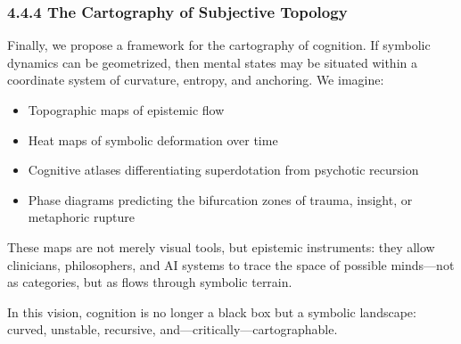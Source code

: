 \subsubsection*{4.4.4 The Cartography of Subjective Topology}

Finally, we propose a framework for the cartography of cognition. If symbolic dynamics can be geometrized, then mental states may be situated within a coordinate system of curvature, entropy, and anchoring. We imagine:
\begin{itemize}
\item Topographic maps of epistemic flow
\item Heat maps of symbolic deformation over time
\item Cognitive atlases differentiating superdotation from psychotic recursion
\item Phase diagrams predicting the bifurcation zones of trauma, insight, or metaphoric rupture
\end{itemize}

These maps are not merely visual tools, but epistemic instruments: they allow clinicians, philosophers, and AI systems to trace the space of possible minds—not as categories, but as flows through symbolic terrain.

In this vision, cognition is no longer a black box but a symbolic landscape: curved, unstable, recursive, and—critically—cartographable.